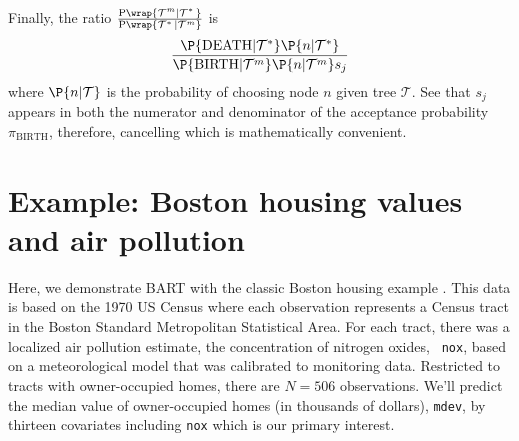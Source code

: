 \documentclass[cmbright,doublespace]{WileySTAT-V1}
\theoremstyle{plain}
\begin{document}
Finally, the ratio $ \frac{\mathrm{P}\wrap{\mathcal{T}^m|\mathcal{T}^*\,}}
{\mathrm{P}\wrap{\mathcal{T}^*\,|\mathcal{T}^m}}$ is 
\begin{align*}
\frac{\P{\mathrm{DEATH}|\mathcal{T}^*}
\P{n|\mathcal{T}^*}}
{\P{\mathrm{BIRTH}|\mathcal{T}^m}\P{n|\mathcal{T}^m} s_j}
\end{align*}
where $\P{n|\mathcal{T}} $ is the probability of choosing node
$n$ given tree $\mathcal{T}$.  See that
$s_j$ appears in both the numerator and denominator
of the acceptance probability $\pi_{\mathrm{BIRTH}}$,
therefore, cancelling which is mathematically convenient.


\section{Example: Boston housing values and air pollution}
\label{Boston}

Here, we demonstrate BART with the classic Boston housing example
\citep{HarrRubi78}.  This data is based on the 1970 US Census where
each observation represents a Census tract in the Boston Standard
Metropolitan Statistical Area.  For each tract, there was a localized
air pollution estimate, the concentration of nitrogen oxides, {\tt
  nox}, based on a meteorological model that was calibrated to
monitoring data.  Restricted to tracts with owner-occupied homes,
there are $N=506$ observations.  We'll predict the median value of
owner-occupied homes (in thousands of dollars), {\tt mdev}, by
thirteen covariates including {\tt nox} which is our primary interest.
\end{document}

